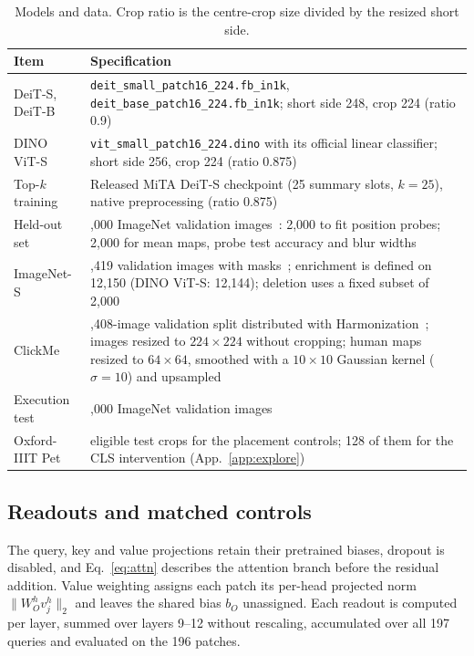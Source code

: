 \begin{table}[!htbp]
\caption{Models and data. Crop ratio is the centre-crop size divided by the resized short side.}
\label{tab:app-data}
\centering\footnotesize
\setlength{\tabcolsep}{4pt}
\begin{tabular}{@{}l>{\raggedright\arraybackslash}p{4.25in}@{}}
\toprule
Item & Specification\\
\midrule
DeiT-S, DeiT-B & \texttt{deit\_small\_patch16\_224.fb\_in1k}, \texttt{deit\_base\_patch16\_224.fb\_in1k}; short side 248, crop 224 (ratio 0.9)\\
DINO ViT-S & \texttt{vit\_small\_patch16\_224.dino} with its official linear classifier; short side 256, crop 224 (ratio 0.875)\\
Top-$k$ training & Released MiTA DeiT-S checkpoint (25 summary slots, $k=25$), native preprocessing (ratio 0.875)\\
Held-out set & 4,000 ImageNet validation images~\citep{deng2009}: 2,000 to fit position probes; 2,000 for mean maps, probe test accuracy and blur widths\\
ImageNet-S & 12,419 validation images with masks~\citep{gao2023}; enrichment is defined on 12,150 (DINO ViT-S: 12,144); deletion uses a fixed subset of 2,000\\
ClickMe & 17,408-image validation split distributed with Harmonization~\citep{fel2022}; images resized to $224{\times}224$ without cropping; human maps resized to $64{\times}64$, smoothed with a $10{\times}10$ Gaussian kernel ($\sigma=10$) and upsampled\\
Execution test & 5,000 ImageNet validation images\\
Oxford-IIIT Pet & 383 eligible test crops for the placement controls; 128 of them for the CLS intervention (App.~\ref{app:explore})\\
\bottomrule
\end{tabular}
\end{table}

\subsection{Readouts and matched controls}
The query, key and value projections retain their pretrained biases, dropout is disabled, and Eq.~\ref{eq:attn} describes the attention branch before the residual addition. Value weighting assigns each patch its per-head projected norm $\lVert W_O^h v_j^h\rVert_2$ and leaves the shared bias $b_O$ unassigned. Each readout is computed per layer, summed over layers 9--12 without rescaling, accumulated over all 197 queries and evaluated on the 196 patches.

